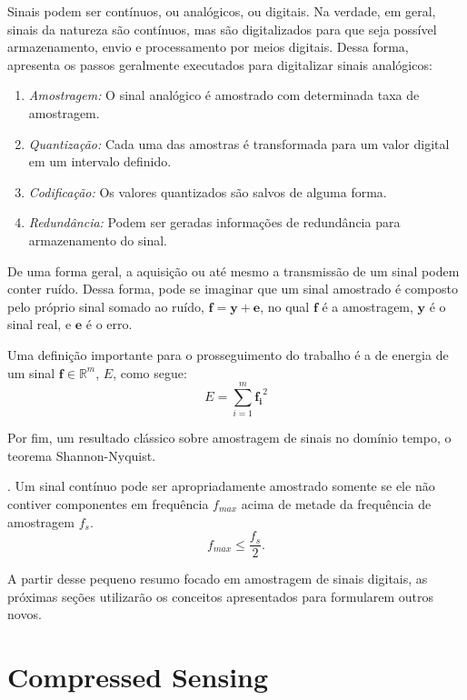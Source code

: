 \documentclass[cic,tc]{iiufrgs}
\renewcommand{\vec}[1]{\bm{#1}}
\begin{document}
Sinais podem ser contínuos, ou analógicos, ou digitais.
Na verdade, em geral, sinais da natureza são contínuos, mas são digitalizados 
para que seja possível armazenamento, envio e processamento por meios digitais.
Dessa forma, \citet{haykin2001sinais} apresenta os passos geralmente executados 
para digitalizar sinais analógicos:
\begin{enumerate}
    \item \emph{Amostragem:} O sinal analógico é amostrado com determinada taxa de amostragem.
    \item \emph{Quantização:} Cada uma das amostras é transformada para um valor digital em um intervalo definido.
    \item \emph{Codificação:} Os valores quantizados são salvos de alguma forma.
    \item \emph{Redundância:} Podem ser geradas informações de redundância para armazenamento do sinal.
\end{enumerate} 

De uma forma geral, a aquisição ou até mesmo a transmissão de um sinal podem conter ruído.
Dessa forma, pode se imaginar que um sinal amostrado é composto pelo próprio sinal somado ao ruído,
$\vec{f} = \vec{y} + \vec{e}$, no qual $\vec{f}$ é a amostragem, $\vec{y}$ é o sinal real, 
e $\vec{e}$ é o erro.


Uma definição importante para o prosseguimento do trabalho é a de energia de um sinal $\vec{f} \in \mathbb{R}^m$,
$E$, como segue:
\begin{equation}
    E = \sum_{i=1}^m \vec{f_i}^2
\end{equation}

Por fim, um resultado clássico sobre amostragem de sinais no domínio tempo, o teorema Shannon-Nyquist.
\begin{teorema}
    \cite{NyquistSampling}.
    Um sinal contínuo pode ser apropriadamente amostrado somente se ele não contiver 
    componentes em frequência $f_{max}$ acima de metade da frequência de amostragem $f_s$.
    \begin{equation*}
        f_{max} \le \frac{f_s}{2}.
    \end{equation*}
\end{teorema}

A partir desse pequeno resumo focado em amostragem de sinais digitais,
as próximas seções utilizarão os conceitos apresentados para formularem outros novos.

\section{Compressed Sensing}
\end{document}

